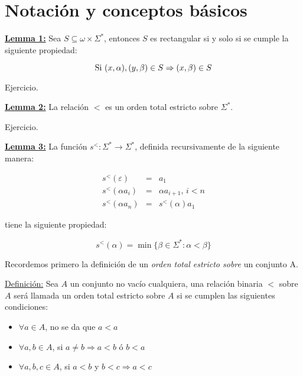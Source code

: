 \section{Notación y conceptos básicos}

  \textbf{\underline{Lemma 1:}} Sea $S\subseteq \omega \times \Sigma^{\ast}$, entonces $S$ es rectangular si y
    solo si se cumple la siguiente propiedad:

    \[
      \textup{Si } (x, \alpha), (y, \beta) \in S \Rightarrow (x, \beta) \in S
    \]

  \PROOF Ejercicio.

  \QED


  \textbf{\underline{Lemma 2:}} La relación $<$ es un orden total estricto sobre $\Sigma^{\ast}$.

  \PROOF Ejercicio.

  \QED


  \textbf{\underline{Lemma 3:}} La función $s^{<}: \Sigma^{\ast} \rightarrow \Sigma^{\ast}$, definida recursivamente
    de la siguiente manera:

    \begin{eqnarray}
  		\nonumber s^{<}(\varepsilon) &=& a_{1} \\
  		\nonumber s^{<}(\alpha a_{i}) &=& \alpha a_{i+1} \text{, } i < n \\
  		\nonumber s^{<}(\alpha a_{n}) &=& s^{<}(\alpha) a_{1}
    \end{eqnarray}

    \par tiene la siguiente propiedad:

    \[
      s^{<}(\alpha) = \min \{\beta \in \Sigma^{\ast}: \alpha < \beta\}
    \]

  \PROOF Recordemos primero la definición de un \textit{orden total estricto sobre} un conjunto A.

    \vspace{5mm}
    \par \underline{Definición:} Sea $A$ un conjunto no vacío cualquiera, una relación binaria $<$ sobre $A$ será
    llamada un orden total estricto sobre $A$ si se cumplen las siguientes condiciones:

    \begin{itemize}
      \item $\forall a \in A$, no se da que $a < a$
      \item $\forall a, b \in A$, si $a \neq b \Rightarrow a < b$ ó $b < a$
      \item $\forall a, b, c \in A$, si $a < b$ y $b < c \Rightarrow a < c$
    \end{itemize}

